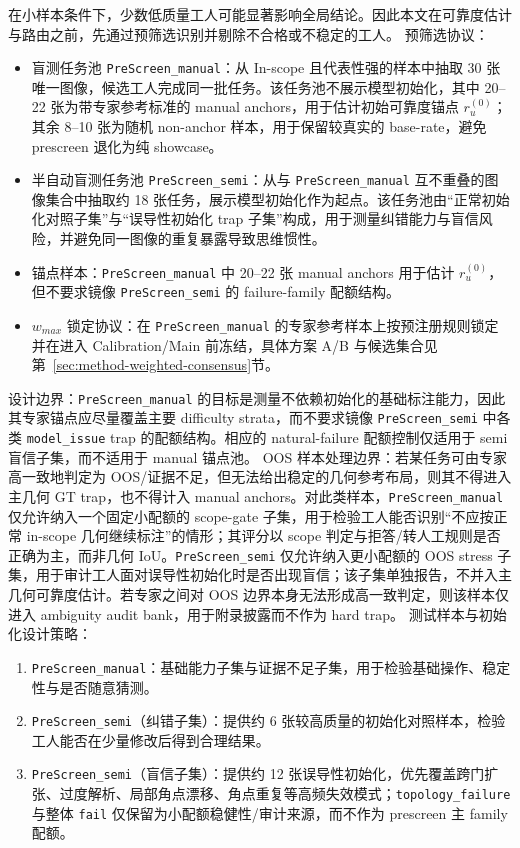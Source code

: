 在小样本条件下，少数低质量工人可能显著影响全局结论。因此本文在可靠度估计与路由之前，先通过预筛选识别并剔除不合格或不稳定的工人。
预筛选协议：
\begin{itemize}
    \item 盲测任务池 \texttt{PreScreen\_manual}：从 In-scope 且代表性强的样本中抽取 30 张唯一图像，候选工人完成同一批任务。该任务池不展示模型初始化，其中 20--22 张为带专家参考标准的 manual anchors，用于估计初始可靠度锚点 $r_u^{\left(0\right)}$；其余 8--10 张为随机 non-anchor 样本，用于保留较真实的 base-rate，避免 prescreen 退化为纯 showcase。
    \item 半自动盲测任务池 \texttt{PreScreen\_semi}：从与 \texttt{PreScreen\_manual} 互不重叠的图像集合中抽取约 18 张任务，展示模型初始化作为起点。该任务池由“正常初始化对照子集”与“误导性初始化 trap 子集”构成，用于测量纠错能力与盲信风险，并避免同一图像的重复暴露导致思维惯性。
    \item 锚点样本：\texttt{PreScreen\_manual} 中 20--22 张 manual anchors 用于估计 $r_u^{\left(0\right)}$，但不要求镜像 \texttt{PreScreen\_semi} 的 failure-family 配额结构。
    \item $w_{max}$ 锁定协议：在 \texttt{PreScreen\_manual} 的专家参考样本上按预注册规则锁定并在进入 Calibration/Main 前冻结，具体方案 A/B 与候选集合见第~\ref{sec:method-weighted-consensus}节。
\end{itemize}
\noindent 设计边界：\texttt{PreScreen\_manual} 的目标是测量不依赖初始化的基础标注能力，因此其专家锚点应尽量覆盖主要 difficulty strata，而不要求镜像 \texttt{PreScreen\_semi} 中各类 \texttt{model\_issue} trap 的配额结构。相应的 natural-failure 配额控制仅适用于 semi 盲信子集，而不适用于 manual 锚点池。
\noindent OOS 样本处理边界：若某任务可由专家高一致地判定为 OOS/证据不足，但无法给出稳定的几何参考布局，则其不得进入主几何 GT trap，也不得计入 manual anchors。对此类样本，\texttt{PreScreen\_manual} 仅允许纳入一个固定小配额的 scope-gate 子集，用于检验工人能否识别“不应按正常 in-scope 几何继续标注”的情形；其评分以 scope 判定与拒答/转人工规则是否正确为主，而非几何 IoU。\texttt{PreScreen\_semi} 仅允许纳入更小配额的 OOS stress 子集，用于审计工人面对误导性初始化时是否出现盲信；该子集单独报告，不并入主几何可靠度估计。若专家之间对 OOS 边界本身无法形成高一致判定，则该样本仅进入 ambiguity audit bank，用于附录披露而不作为 hard trap。
测试样本与初始化设计策略：
\begin{enumerate}
    \item \texttt{PreScreen\_manual}：基础能力子集与证据不足子集，用于检验基础操作、稳定性与是否随意猜测。
    \item \texttt{PreScreen\_semi}（纠错子集）：提供约 6 张较高质量的初始化对照样本，检验工人能否在少量修改后得到合理结果。
    \item \texttt{PreScreen\_semi}（盲信子集）：提供约 12 张误导性初始化，优先覆盖跨门扩张、过度解析、局部角点漂移、角点重复等高频失效模式；\texttt{topology\_failure} 与整体 \texttt{fail} 仅保留为小配额稳健性/审计来源，而不作为 prescreen 主 family 配额。
\end{enumerate}
